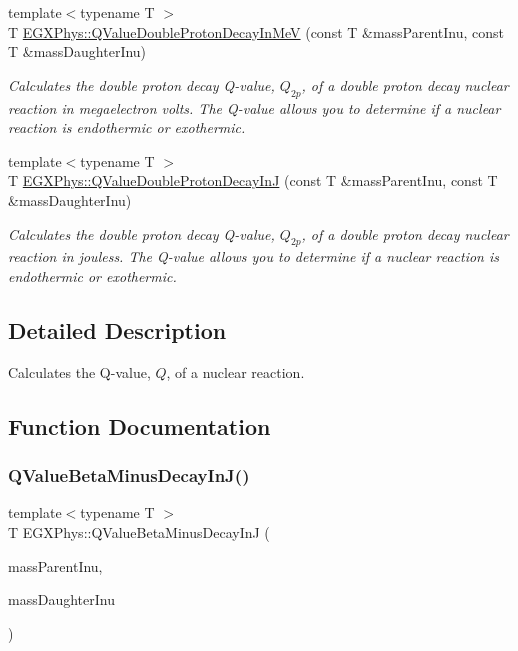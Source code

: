 \begin{DoxyCompactItemize}
{\footnotesize template$<$typename T $>$ }\\T \hyperlink{group___q_value_ga4a57c8901e92918f08bee52493b81c59}{E\+G\+X\+Phys\+::\+Q\+Value\+Double\+Proton\+Decay\+In\+MeV} (const T \&mass\+Parent\+Inu, const T \&mass\+Daughter\+Inu)
\begin{DoxyCompactList}\small\item\em Calculates the double proton decay Q-\/value, $Q_{2p}$, of a double proton decay nuclear reaction in megaelectron volts. The Q-\/value allows you to determine if a nuclear reaction is endothermic or exothermic. \end{DoxyCompactList}\item 
{\footnotesize template$<$typename T $>$ }\\T \hyperlink{group___q_value_ga64a3867f65de5586feab99527bb03d31}{E\+G\+X\+Phys\+::\+Q\+Value\+Double\+Proton\+Decay\+InJ} (const T \&mass\+Parent\+Inu, const T \&mass\+Daughter\+Inu)
\begin{DoxyCompactList}\small\item\em Calculates the double proton decay Q-\/value, $Q_{2p}$, of a double proton decay nuclear reaction in jouless. The Q-\/value allows you to determine if a nuclear reaction is endothermic or exothermic. \end{DoxyCompactList}\end{DoxyCompactItemize}


\subsection{Detailed Description}
Calculates the Q-\/value, $Q$, of a nuclear reaction. 

\subsection{Function Documentation}
\mbox{\label{group___q_value_ga4a2ab24ffb317abc97ce46c92bb64c3c}} 
\subsubsection{\texorpdfstring{Q\+Value\+Beta\+Minus\+Decay\+In\+J()}{QValueBetaMinusDecayInJ()}}
{\footnotesize\ttfamily template$<$typename T $>$ \\
T E\+G\+X\+Phys\+::\+Q\+Value\+Beta\+Minus\+Decay\+InJ (\begin{DoxyParamCaption}\item[{const T \&}]{mass\+Parent\+Inu,  }\item[{const T \&}]{mass\+Daughter\+Inu }\end{DoxyParamCaption})}



